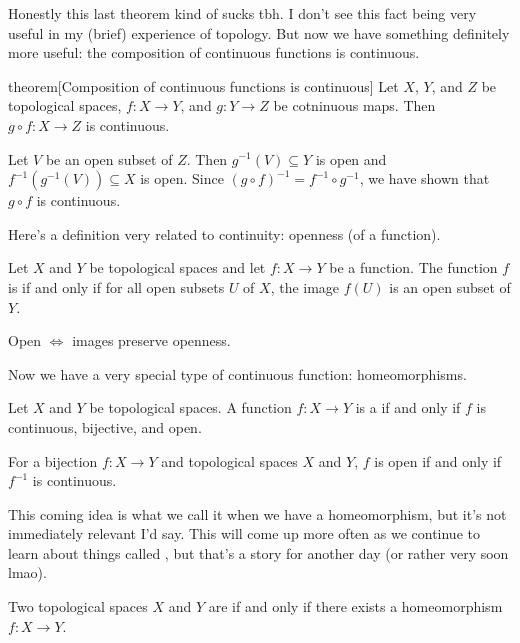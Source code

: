 \documentclass[class=article, crop=false]{standalone}
\begin{document}
Honestly this last theorem kind of sucks tbh. I don't see this fact being very useful in my (brief) experience of topology. But now we have something definitely more useful: the composition of continuous functions is continuous.

\begin{result}{theorem}[Composition of continuous functions is continuous]
  Let $X$, $Y$, and $Z$ be topological spaces, $f \colon X \to Y$, and $g \colon Y \to Z$ be cotninuous maps. Then $g \circ f \colon X \to Z$ is continuous.
\end{result}
\begin{pf}
  Let $V$ be an open subset of $Z$. Then $g^{-1}(V) \subseteq Y$ is open and $f^{-1}(g^{-1}(V)) \subseteq X$ is open. Since $(g \circ f)^{-1} = f^{-1} \circ g^{-1}$, we have shown that $g \circ f$ is continuous.
\end{pf}

Here's a definition very related to continuity: openness (of a function).

\begin{defn}
  Let $X$ and $Y$ be topological spaces and let $f \colon X \to Y$ be a function. The function $f$ is  if and only if for all open subsets $U$ of $X$, the image $f(U)$ is an open subset of $Y$.
\end{defn}

\begin{slogan}
  Open $\iff$ images preserve openness.
\end{slogan}

Now we have a very special type of continuous function: homeomorphisms.
\begin{defn}[Homeomorphism]
  Let $X$ and $Y$ be topological spaces. A function $f \colon X \to Y$ is a  if and only if $f$ is continuous, bijective, and open.
\end{defn}
\begin{rem}
  For a bijection $f \colon X \to Y$ and topological spaces $X$ and $Y$, $f$ is open if and only if $f^{-1}$ is continuous.
\end{rem}

This coming idea is what we call it when we have a homeomorphism, but it's not immediately relevant I'd say. This will come up more often as we continue to learn about things called , but that's a story for another day (or rather very soon lmao).

\begin{defn}
  Two topological spaces $X$ and $Y$ are  if and only if there exists a homeomorphism $f \colon X \to Y$.
\end{defn}
\end{document}
